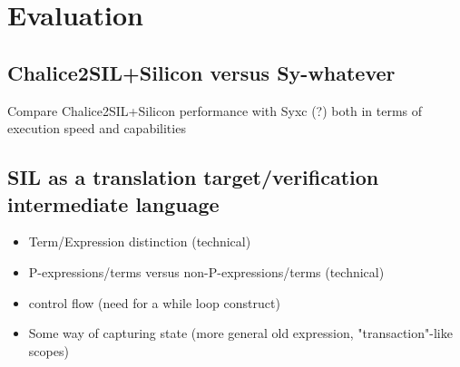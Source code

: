 
\section{Evaluation}

\subsection{Chalice2SIL+Silicon versus Sy-whatever}
\begin{sketch}
Compare Chalice2SIL+Silicon performance with Syxc (?) both in terms of execution speed and capabilities
\end{sketch}

\subsection{SIL as a translation target/verification intermediate language}
\begin{sketch}
\begin{itemize}
\item Term/Expression distinction (technical)
\item P-expressions/terms versus non-P-expressions/terms (technical)
\item control flow (need for a while loop construct)
\item Some way of capturing state (more general old expression, "transaction"-like scopes)
\end{itemize}
\end{sketch}
